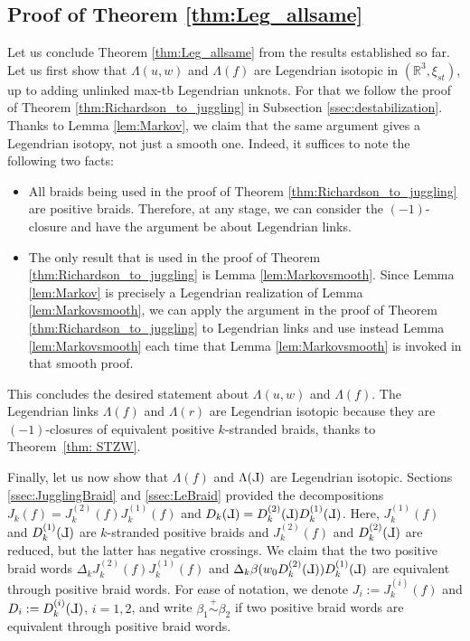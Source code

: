 \documentclass[10pt]{amsart}
\theoremstyle{plain}
\theoremstyle{definition}
\theoremstyle{remark}
\numberwithin{equation}{section}
\newcommand{\R}{\mathbb{R}}
\def\Le{\reflectbox{$\mathrm{L}$}}
\begin{document}

\subsection{Proof of Theorem \ref{thm:Leg_allsame}}\label{ssec:Leg_isotopic} Let us conclude Theorem \ref{thm:Leg_allsame} from the results established so far. Let us first show that $\Lambda(u, w)$ and $\Lambda(f)$ are Legendrian isotopic in $(\R^{3},\xi_{st})$, up to adding unlinked max-tb Legendrian unknots. For that we follow the proof of Theorem \ref{thm:Richardson_to_juggling} in Subsection \ref{ssec:destabilization}. Thanks to Lemma \ref{lem:Markov}, we claim that the same argument gives a Legendrian isotopy, not just a smooth one. Indeed,  it suffices to note the following two facts:
\begin{itemize}
    \item[(i)] All braids being used in the proof of Theorem \ref{thm:Richardson_to_juggling} are positive braids.  Therefore, at any stage, we can consider the $(-1)$-closure and have the argument be about Legendrian links.\\

    \item[(ii)] The only result that is used in the proof of Theorem \ref{thm:Richardson_to_juggling} is Lemma \ref{lem:Markovsmooth}. Since Lemma \ref{lem:Markov} is precisely a Legendrian realization of Lemma \ref{lem:Markovsmooth}, we can apply the argument in the proof of Theorem \ref{thm:Richardson_to_juggling} to Legendrian links and use instead Lemma \ref{lem:Markovsmooth} each time that Lemma \ref{lem:Markovsmooth} is invoked in that smooth proof.\\
\end{itemize}
\noindent This concludes the desired statement about $\Lambda(u, w)$ and $\Lambda(f)$. The Legendrian links $\Lambda(f)$ and $\Lambda(r)$ are Legendrian isotopic because they are $(-1)$-closures of equivalent positive $k$-stranded braids, thanks to Theorem~\ref{thm: STZW}.


Finally, let us now show that $\Lambda(f)$ and $\Lambda(\Le)$ are Legendrian isotopic. Sections \ref{ssec:JugglingBraid} and \ref{ssec:LeBraid}  provided the decompositions $J_k(f)=J^{(2)}_k(f)J_k^{(1)}(f)$ and $D_k(\Le)=D_k^{(2)}(\Le)D_k^{(1)}(\Le)$. Here, $J_k^{(1)}(f)$ and $D_k^{(1)}(\Le)$ are $k$-stranded positive braids and $J_k^{(2)}(f)$ and $D_k^{(2)}(\Le)$ are reduced, but the latter has negative crossings. We claim that the two positive braid words $\Delta_kJ^{(2)}_k(f)J_k^{(1)}(f)$ and $\Delta_{k}\beta(w_0D_{k}^{(2)}(\Le))D_k^{(1)}(\Le)$ are equivalent through positive braid words. For ease of notation, we denote $J_i:=J_k^{(i)}(f)$ and $D_i:=D_k^{(i)}(\Le)$, $i=1,2$, and write $\beta_1\stackrel{+}{\sim}\beta_2$ if two positive braid words are equivalent through positive braid words.
\end{document}
